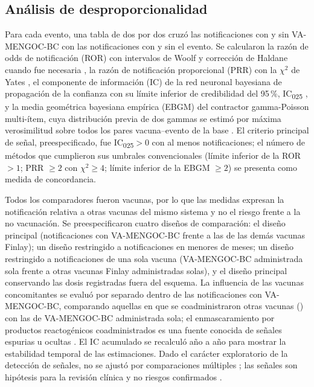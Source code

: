 \documentclass[11pt]{article}
\begin{document}
\subsection{Análisis de desproporcionalidad}\label{sec:m-disp}
Para cada evento, una tabla de dos por dos cruzó las notificaciones con y sin VA-MENGOC-BC con las
notificaciones con y sin el evento. Se calcularon la razón de odds de notificación (ROR) con
intervalos de Woolf y corrección de Haldane cuando fue necesaria
\cite{vanPuijenbroek2002,Woolf1955,Haldane1956}, la razón de notificación proporcional (PRR) con la
$\chi^2$ de Yates \cite{Evans2001}, el componente de información (IC) de la red neuronal bayesiana de
propagación de la confianza con su límite inferior de credibilidad del 95\,\%,
IC\textsubscript{025} \cite{Bate1998,Noren2013}, y la media geométrica bayesiana empírica (EBGM) del
contractor gamma-Poisson multi-ítem, cuya distribución previa de dos gammas se estimó por máxima
verosimilitud sobre todos los pares vacuna--evento de la base \cite{DuMouchel1999,Szarfman2002}. El
criterio principal de señal, preespecificado, fue IC\textsubscript{025}${}>0$ con al menos
\PODispMinReports{} notificaciones; el número de métodos que cumplieron sus umbrales convencionales
(límite inferior de la ROR ${}>1$; PRR ${}\geq2$ con $\chi^2\geq4$; límite inferior de la EBGM
${}\geq2$) se presenta como medida de concordancia.

Todos los comparadores fueron vacunas, por lo que las medidas expresan la notificación relativa a
otras vacunas del mismo sistema y no el riesgo frente a la no vacunación. Se preespecificaron cuatro
diseños de comparación: el diseño principal (notificaciones con VA-MENGOC-BC frente a las de las
demás vacunas Finlay); un diseño restringido a notificaciones en menores de \POInfantMonths{}
meses; un diseño restringido a notificaciones de una sola vacuna (VA-MENGOC-BC administrada sola
frente a otras vacunas Finlay administradas solas), y el diseño principal conservando las dosis
registradas fuera del esquema. La influencia de las vacunas concomitantes se evaluó por separado
dentro de las notificaciones con VA-MENGOC-BC, comparando aquellas en que se coadministraron otras
vacunas (\PONTargetCoadmin) con las de VA-MENGOC-BC administrada sola; el enmascaramiento por
productos reactogénicos coadministrados es una fuente conocida de señales espurias u ocultas
\cite{Maignen2014}. El IC acumulado se recalculó año a
año para mostrar la estabilidad temporal de las estimaciones. Dado el carácter exploratorio de la
detección de señales, no se ajustó por comparaciones múltiples \cite{Rothman1990}; las señales son
hipótesis para la revisión clínica y no riesgos confirmados
\cite{Fusaroli2026Pitfalls,Fusaroli2026Causal}.
\end{document}

